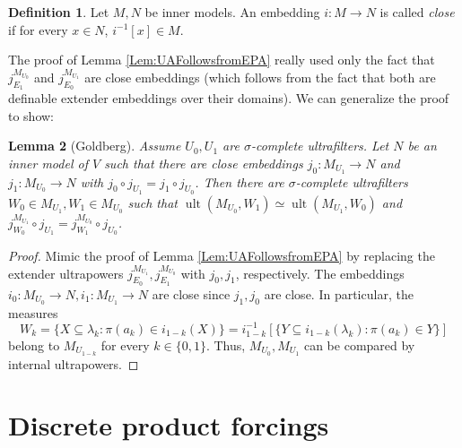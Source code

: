 \documentclass{article}
\theoremstyle{definition}
\newtheorem{definition}{Definition}[section]
\theoremstyle{plain}
\newtheorem{lemma}[definition]{Lemma}
\DeclareMathOperator{\Ult}{ult}
\begin{document}
\begin{definition}
    Let $M,N$ be inner models. An embedding $i\colon M\to N$ is called \textit{close} if for every $x\in N$, $i^{-1}[x]\in M$.
\end{definition}

The proof of Lemma \ref{Lem:UAFollowsfromEPA} really used only the fact that $j^{M_{U_0}}_{E_1}$ and $j^{M_{U_1}}_{E_0}$ are close embeddings (which follows from the fact that both are definable extender embeddings over their domains). We can generalize the proof to show:

\begin{lemma}[Goldberg]\label{Lem:ComparisonByCloseEmbeddings}
    Assume $U_0, U_1$ are $\sigma$-complete ultrafilters. Let $N$ be an inner model of $V$ such that there are close embeddings $j_0\colon M_{U_1}\to N$ and $j_1\colon M_{U_0}\to N$ with $j_0\circ j_{U_1} = j_1\circ j_{U_0}$. Then there are $\sigma$-complete ultrafilters $W_0\in M_{U_1}, W_1\in M_{U_0}$ such that $\Ult(M_{U_0}, W_1)\simeq \Ult(M_{U_1}, W_0)$ and $j^{M_{U_1}}_{W_0}\circ j_{U_1} = j^{M_{U_0}}_{W_1}\circ j_{U_0}$. 
\end{lemma}

\begin{proof}
    Mimic the proof of Lemma \ref{Lem:UAFollowsfromEPA} by replacing the extender ultrapowers $j^{M_{U_1}}_{E_0}, j^{M_{U_0}}_{E_1}$ with $j_0, j_1$, respectively. The embeddings $i_0\colon M_{U_0}\to N, i_1\colon M_{U_1}\to N$ are close since $j_1, j_0$ are close. In particular, the measures 
    $$W_k = \{ X\subseteq \lambda_k \colon \pi(a_k)\in i_{1-k}(X)  \} = i_{1-k}^{-1}[ \{ Y\subseteq i_{1-k}(\lambda_k)\colon \pi(a_k)\in Y \} ]$$
    belong to $M_{U_{1-k}}$ for every $k\in \{0,1\}$. Thus, $M_{U_0}, M_{U_1}$ can be compared by internal ultrapowers.
\end{proof}
 

\section{Discrete product forcings}\label{Sec:DiscreteProductForcing}
\end{document}
